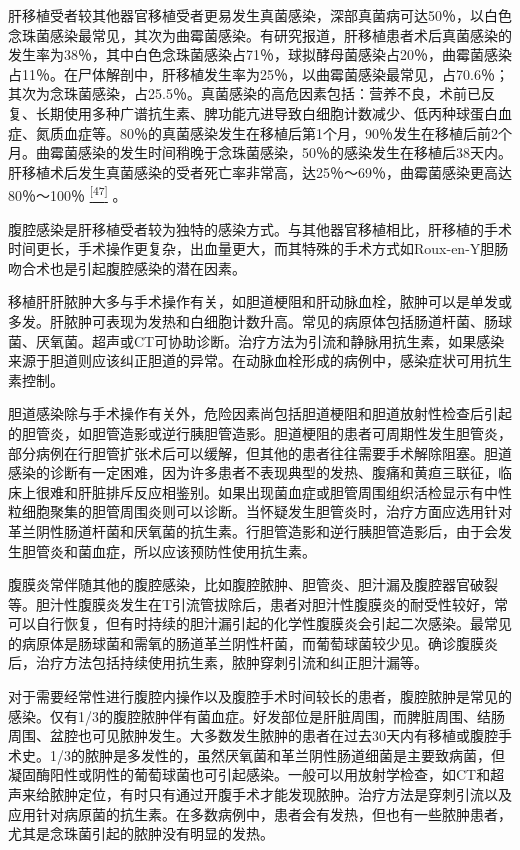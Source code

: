 肝移植受者较其他器官移植受者更易发生真菌感染，深部真菌病可达50％，以白色念珠菌感染最常见，其次为曲霉菌感染。有研究报道，肝移植患者术后真菌感染的发生率为38％，其中白色念珠菌感染占71％，球拟酵母菌感染占20％，曲霉菌感染占11％。在尸体解剖中，肝移植发生率为25％，以曲霉菌感染最常见，占70.6％；其次为念珠菌感染，占25.5％。真菌感染的高危因素包括：营养不良，术前已反复、长期使用多种广谱抗生素、脾功能亢进导致白细胞计数减少、低丙种球蛋白血症、氮质血症等。80％的真菌感染发生在移植后第1个月，90％发生在移植后前2个月。曲霉菌感染的发生时间稍晚于念珠菌感染，50％的感染发生在移植后38天内。肝移植术后发生真菌感染的受者死亡率非常高，达25％～69％，曲霉菌感染更高达80％～100％
\protect\hyperlink{text00020.htmlux5cux23ch47-19}{\textsuperscript{{[}47{]}}}
。

腹腔感染是肝移植受者较为独特的感染方式。与其他器官移植相比，肝移植的手术时间更长，手术操作更复杂，出血量更大，而其特殊的手术方式如Roux-en-Y胆肠吻合术也是引起腹腔感染的潜在因素。

移植肝肝脓肿大多与手术操作有关，如胆道梗阻和肝动脉血栓，脓肿可以是单发或多发。肝脓肿可表现为发热和白细胞计数升高。常见的病原体包括肠道杆菌、肠球菌、厌氧菌。超声或CT可协助诊断。治疗方法为引流和静脉用抗生素，如果感染来源于胆道则应该纠正胆道的异常。在动脉血栓形成的病例中，感染症状可用抗生素控制。

胆道感染除与手术操作有关外，危险因素尚包括胆道梗阻和胆道放射性检查后引起的胆管炎，如胆管造影或逆行胰胆管造影。胆道梗阻的患者可周期性发生胆管炎，部分病例在行胆管扩张术后可以缓解，但其他的患者往往需要手术解除阻塞。胆道感染的诊断有一定困难，因为许多患者不表现典型的发热、腹痛和黄疸三联征，临床上很难和肝脏排斥反应相鉴别。如果出现菌血症或胆管周围组织活检显示有中性粒细胞聚集的胆管周围炎则可以诊断。当怀疑发生胆管炎时，治疗方面应选用针对革兰阴性肠道杆菌和厌氧菌的抗生素。行胆管造影和逆行胰胆管造影后，由于会发生胆管炎和菌血症，所以应该预防性使用抗生素。

腹膜炎常伴随其他的腹腔感染，比如腹腔脓肿、胆管炎、胆汁漏及腹腔器官破裂等。胆汁性腹膜炎发生在T引流管拔除后，患者对胆汁性腹膜炎的耐受性较好，常可以自行恢复，但有时持续的胆汁漏引起的化学性腹膜炎会引起二次感染。最常见的病原体是肠球菌和需氧的肠道革兰阴性杆菌，而葡萄球菌较少见。确诊腹膜炎后，治疗方法包括持续使用抗生素，脓肿穿刺引流和纠正胆汁漏等。

对于需要经常性进行腹腔内操作以及腹腔手术时间较长的患者，腹腔脓肿是常见的感染。仅有1/3的腹腔脓肿伴有菌血症。好发部位是肝脏周围，而脾脏周围、结肠周围、盆腔也可见脓肿发生。大多数发生脓肿的患者在过去30天内有移植或腹腔手术史。1/3的脓肿是多发性的，虽然厌氧菌和革兰阴性肠道细菌是主要致病菌，但凝固酶阳性或阴性的葡萄球菌也可引起感染。一般可以用放射学检查，如CT和超声来给脓肿定位，有时只有通过开腹手术才能发现脓肿。治疗方法是穿刺引流以及应用针对病原菌的抗生素。在多数病例中，患者会有发热，但也有一些脓肿患者，尤其是念珠菌引起的脓肿没有明显的发热。

